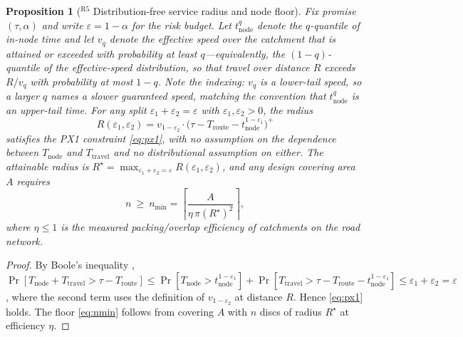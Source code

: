 \documentclass[10pt,twocolumn,letterpaper]{article}
\newtheorem{proposition}{Proposition}
\theoremstyle{definition}
\begin{document}
\begin{proposition}[$^{\mathrm{R5}}$ Distribution-free service radius and node floor]\label{prop:radius}
Fix promise $(\tau,\alpha)$ and write $\varepsilon=1-\alpha$ for the risk budget. Let $t^{q}_{\mathrm{node}}$ denote the $q$-quantile of in-node time and let $v_{q}$ denote the effective speed over the catchment that is \emph{attained or exceeded} with probability at least $q$---equivalently, the $(1-q)$-quantile of the effective-speed distribution, so that travel over distance $R$ exceeds $R/v_q$ with probability at most $1-q$. Note the indexing: $v_q$ is a lower-tail speed, so a larger $q$ names a \emph{slower} guaranteed speed, matching the convention that $t^{q}_{\mathrm{node}}$ is an upper-tail time. For any split $\varepsilon_1+\varepsilon_2=\varepsilon$ with $\varepsilon_1,\varepsilon_2>0$, the radius
\begin{equation}\label{eq:radius}
R(\varepsilon_1,\varepsilon_2)=v_{1-\varepsilon_2}\cdot\bigl(\tau-T_{\mathrm{route}}-t^{1-\varepsilon_1}_{\mathrm{node}}\bigr)^{+}
\end{equation}
satisfies the PX1 constraint \eqref{eq:px1}, with no assumption on the dependence between $T_{\mathrm{node}}$ and $T_{\mathrm{travel}}$ and no distributional assumption on either. The attainable radius is $R^\star=\max_{\varepsilon_1+\varepsilon_2=\varepsilon}R(\varepsilon_1,\varepsilon_2)$, and any design covering area $A$ requires
\begin{equation}\label{eq:nmin}
n\ \ge\ n_{\min}=\left\lceil \frac{A}{\eta\,\pi (R^\star)^2}\right\rceil,
\end{equation}
where $\eta\le1$ is the measured packing/overlap efficiency of catchments on the road network.
\end{proposition}
\begin{proof}
By Boole's inequality \cite{feller1968}, $\Pr[T_{\mathrm{node}}+T_{\mathrm{travel}}>\tau-T_{\mathrm{route}}]\le\Pr[T_{\mathrm{node}}>t^{1-\varepsilon_1}_{\mathrm{node}}]+\Pr[T_{\mathrm{travel}}>\tau-T_{\mathrm{route}}-t^{1-\varepsilon_1}_{\mathrm{node}}]\le\varepsilon_1+\varepsilon_2=\varepsilon$, where the second term uses the definition of $v_{1-\varepsilon_2}$ at distance $R$. Hence \eqref{eq:px1} holds. The floor \eqref{eq:nmin} follows from covering $A$ with $n$ discs of radius $R^\star$ at efficiency $\eta$.
\end{proof}
\end{document}
